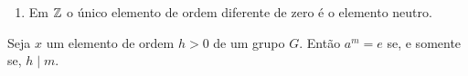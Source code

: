 \documentclass{beamer}
\begin{document}
    \begin{frame}
        \begin{exemplos}
            \begin{enumerate}[label={\roman*})]
                \conti

                \item Em $\mathbb{Z}$ \pause o \'unico elemento de ordem diferente de zero \pause \'e o elemento neutro.
            \end{enumerate}
        \end{exemplos}
    \end{frame}

    \begin{frame}
        \begin{proposicao}
            Seja $x$ um elemento de ordem $h > 0$ \pause de um grupo $G$. \pause Ent\~ao $a^m = e$ \pause se, e somente se, $h \mid m$.
        \end{proposicao}
    \end{frame}
\end{document}
